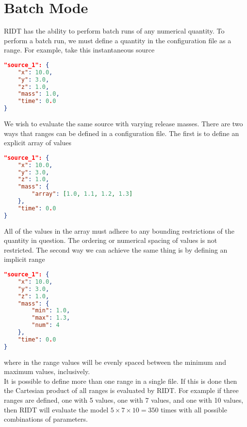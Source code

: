 \documentclass[]{article}
\begin{document}
\section{Batch Mode}
RIDT has the ability to perform batch runs of any numerical quantity. To perform
a batch run, we must define a quantity in the configuration file as a range.
For example, take this instantaneous source\\
\begin{lstlisting}[language=json,firstnumber=1]
"source_1": {
    "x": 10.0,
    "y": 3.0,
    "z": 1.0,
    "mass": 1.0,
    "time": 0.0
}
\end{lstlisting}
\medskip
We wish to evaluate the same source with varying release masses. There are two
ways that ranges can be defined in a configuration file. The first is to define
an explicit array of values\\
\begin{lstlisting}[language=json,firstnumber=1]
"source_1": {
    "x": 10.0,
    "y": 3.0,
    "z": 1.0,
    "mass": {
        "array": [1.0, 1.1, 1.2, 1.3]
    },
    "time": 0.0
}
\end{lstlisting}
\medskip
All of the values in the array must adhere to any bounding restrictions of the
quantity in question. The ordering or numerical spacing of values is not
restricted. The second way we can achieve the same thing is by defining an
implicit range\\
\begin{lstlisting}[language=json,firstnumber=1]
"source_1": {
    "x": 10.0,
    "y": 3.0,
    "z": 1.0,
    "mass": {
        "min": 1.0,
        "max": 1.3,
        "num": 4
    },
    "time": 0.0
}
\end{lstlisting}
\medskip
where in the range values will be evenly spaced between the minimum and maximum
values, inclusively.\\

\noindent It is possible to define more than one range in a single file. If 
this is done then the Cartesian product of all ranges is evaluated by RIDT. For
example if three ranges are defined, one with 5 values, one with 7 values, and
one with 10 values, then RIDT will evaluate the model $5\times7\times10=350$
times with all possible combinations of parameters.\\
\end{document}
